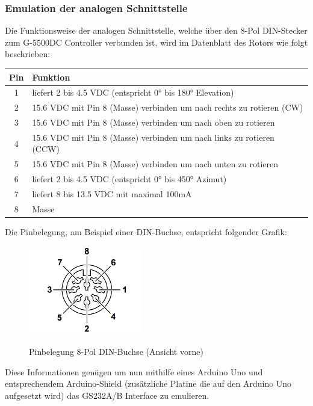 \subsubsection{Emulation der analogen Schnittstelle}
Die Funktionsweise der analogen Schnittstelle, welche über den 8-Pol DIN-Stecker zum G-5500DC Controller verbunden ist, wird im Datenblatt des Rotors \cite{noauthor_yaesu_nodate} wie folgt beschrieben:

\begin{tabular}{| c | l |}
	\hline
	\textbf{Pin} & \textbf{Funktion} \\
	\hline
	1 & liefert 2 bis 4.5 VDC (entspricht 0° bis 180° Elevation) \\
	\hline
	2 & 15.6 VDC mit Pin 8 (Masse) verbinden um nach rechts zu rotieren (CW) \\
	\hline
	3 & 15.6 VDC mit Pin 8 (Masse) verbinden um nach oben zu rotieren \\
	\hline
	4 & 15.6 VDC mit Pin 8 (Masse) verbinden um nach links zu rotieren (CCW) \\
	\hline
	5 & 15.6 VDC mit Pin 8 (Masse) verbinden um nach unten zu rotieren \\
	\hline
	6 & liefert 2 bis 4.5 VDC (entspricht 0° bis 450° Azimut) \\
	\hline
	7 & liefert 8 bis 13.5 VDC mit maximal 100mA \\
	\hline
	8 & Masse \\
	\hline
\end{tabular}

Die Pinbelegung, am Beispiel einer DIN-Buchse, entspricht folgender Grafik: 
\begin{figure}[H]
	\cite{noauthor_yaesu_nodate}
	\centering
	\includegraphics[width=5cm]{../ref/RotorInterfacePinbelegung.png}
	\label{fig:Rotor_Interface_Pinbelegung}
	\caption{Pinbelegung 8-Pol DIN-Buchse (Ansicht vorne)}
\end{figure}

Diese Informationen genügen um nun mithilfe eines Arduino Uno und entsprechendem Arduino-Shield (zusätzliche Platine die auf den Arduino Uno aufgesetzt wird) das GS232A/B Interface zu emulieren.

